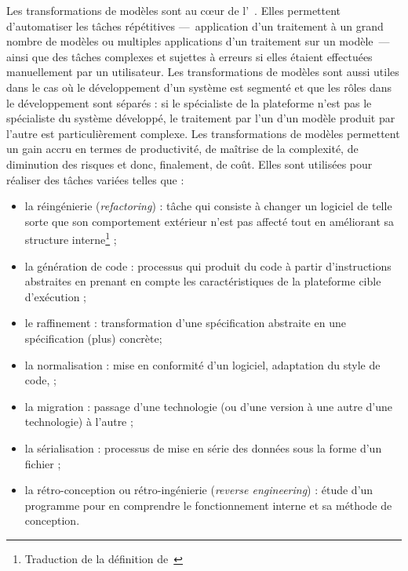 Les transformations de modèles sont au cœur de l'{\idm}~\cite{Sendall2003}.
Elles permettent d'automatiser les tâches répétitives ---~application d'un
traitement à un grand nombre de modèles ou multiples applications d'un
traitement sur un modèle~--- ainsi que des tâches complexes et sujettes à
erreurs si elles étaient effectuées manuellement par un utilisateur. Les
transformations de modèles sont aussi utiles dans le cas où le développement
d'un système est segmenté et que les rôles dans le développement sont séparés :
si le spécialiste de la plateforme n'est pas le spécialiste du système
développé, le traitement par l'un d'un modèle produit par l'autre est
particulièrement complexe. Les transformations de modèles permettent un gain
accru en termes de productivité, de maîtrise de la complexité, de diminution
des risques et donc, finalement, de coût. Elles sont utilisées pour réaliser
des tâches variées telles que : 
\begin{itemize}

  \item la réingénierie %
    (\emph{refactoring}) : tâche qui consiste à changer un logiciel de
    telle sorte que son comportement extérieur n'est pas affecté tout en
    améliorant sa structure interne\footnote{Traduction de la définition
      de~\cite{Fow99}} ;%
  
  \item la génération de code : processus qui produit du code à partir
    d'instructions abstraites en prenant en compte les caractéristiques de la
    plateforme cible d'exécution ;
  
  \item le raffinement : transformation d'une spécification abstraite en une
  spécification (plus) concrète; 
  
  \item la normalisation : mise en conformité d'un logiciel, adaptation du style
  de code, \etc ; 
  
  \item la migration : passage d'une technologie (ou d'une version à une autre
    d'une technologie) à l'autre ;
  
  \item la sérialisation : processus de mise en série des données sous la
  forme d'un fichier ;
  
  \item la rétro-conception ou rétro-ingénierie (\emph{reverse engineering}) :
    étude d'un programme pour en comprendre le fonctionnement interne et
    sa méthode de conception.
\end{itemize}


